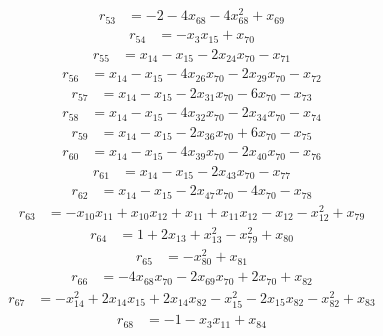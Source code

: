 \[\begin{aligned}
r_{53}&=-2-4x_{68}-4x_{68}^{2}+x_{69}
\end{aligned}\]
\[\begin{aligned}
r_{54}&=-x_{3}x_{15}+x_{70}
\end{aligned}\]
\[\begin{aligned}
r_{55}&=x_{14}-x_{15}-2x_{24}x_{70}-x_{71}
\end{aligned}\]
\[\begin{aligned}
r_{56}&=x_{14}-x_{15}-4x_{26}x_{70}-2x_{29}x_{70}-x_{72}
\end{aligned}\]
\[\begin{aligned}
r_{57}&=x_{14}-x_{15}-2x_{31}x_{70}-6x_{70}-x_{73}
\end{aligned}\]
\[\begin{aligned}
r_{58}&=x_{14}-x_{15}-4x_{32}x_{70}-2x_{34}x_{70}-x_{74}
\end{aligned}\]
\[\begin{aligned}
r_{59}&=x_{14}-x_{15}-2x_{36}x_{70}+6x_{70}-x_{75}
\end{aligned}\]
\[\begin{aligned}
r_{60}&=x_{14}-x_{15}-4x_{39}x_{70}-2x_{40}x_{70}-x_{76}
\end{aligned}\]
\[\begin{aligned}
r_{61}&=x_{14}-x_{15}-2x_{43}x_{70}-x_{77}
\end{aligned}\]
\[\begin{aligned}
r_{62}&=x_{14}-x_{15}-2x_{47}x_{70}-4x_{70}-x_{78}
\end{aligned}\]
\[\begin{aligned}
r_{63}&=-x_{10}x_{11}+x_{10}x_{12}+x_{11}+x_{11}x_{12}-x_{12}-x_{12}^{2}+x_{79}
\end{aligned}\]
\[\begin{aligned}
r_{64}&=1+2x_{13}+x_{13}^{2}-x_{79}^{2}+x_{80}
\end{aligned}\]
\[\begin{aligned}
r_{65}&=-x_{80}^{2}+x_{81}
\end{aligned}\]
\[\begin{aligned}
r_{66}&=-4x_{68}x_{70}-2x_{69}x_{70}+2x_{70}+x_{82}
\end{aligned}\]
\[\begin{aligned}
r_{67}&=-x_{14}^{2}+2x_{14}x_{15}+2x_{14}x_{82}-x_{15}^{2}-2x_{15}x_{82}-x_{82}^{2}+x_{83}
\end{aligned}\]
\[\begin{aligned}
r_{68}&=-1-x_{3}x_{11}+x_{84}
\end{aligned}\]
